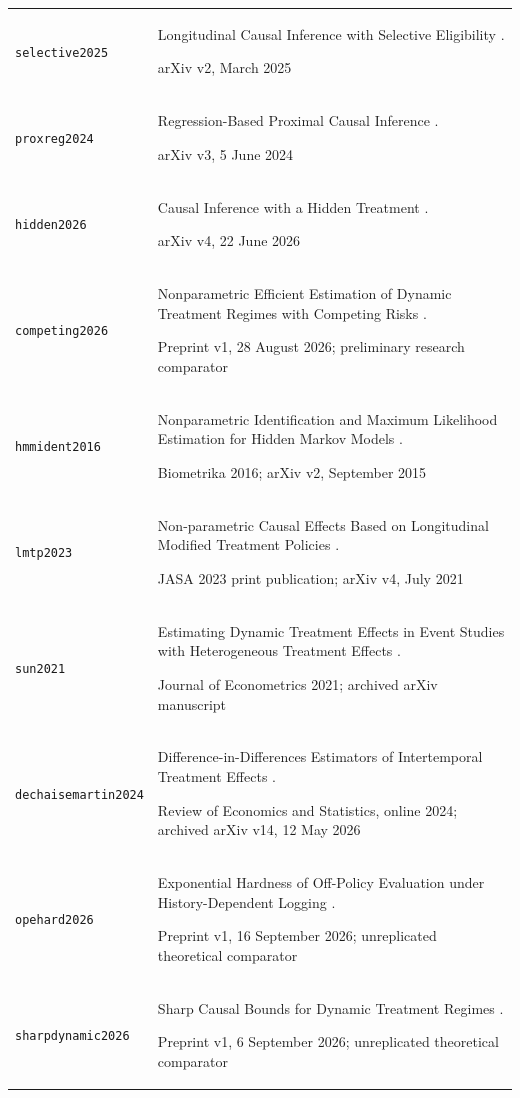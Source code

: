 \begin{longtable}{P{32mm}P{112mm}}
{\scriptsize\texttt{selective2025}} & Longitudinal Causal Inference with Selective Eligibility \citep{selective2025}.\par arXiv v2, March 2025\\
{\scriptsize\texttt{proxreg2024}} & Regression-Based Proximal Causal Inference \citep{proxreg2024}.\par arXiv v3, 5 June 2024\\
{\scriptsize\texttt{hidden2026}} & Causal Inference with a Hidden Treatment \citep{hidden2026}.\par arXiv v4, 22 June 2026\\
{\scriptsize\texttt{competing2026}} & Nonparametric Efficient Estimation of Dynamic Treatment Regimes with Competing Risks \citep{competing2026}.\par Preprint v1, 28 August 2026; preliminary research comparator\\
{\scriptsize\texttt{hmmident2016}} & Nonparametric Identification and Maximum Likelihood Estimation for Hidden Markov Models \citep{hmmident2016}.\par Biometrika 2016; arXiv v2, September 2015\\
{\scriptsize\texttt{lmtp2023}} & Non-parametric Causal Effects Based on Longitudinal Modified Treatment Policies \citep{lmtp2023}.\par JASA 2023 print publication; arXiv v4, July 2021\\
{\scriptsize\texttt{sun2021}} & Estimating Dynamic Treatment Effects in Event Studies with Heterogeneous Treatment Effects \citep{sun2021}.\par Journal of Econometrics 2021; archived arXiv manuscript\\
{\scriptsize\texttt{dechaisemartin2024}} & Difference-in-Differences Estimators of Intertemporal Treatment Effects \citep{dechaisemartin2024}.\par Review of Economics and Statistics, online 2024; archived arXiv v14, 12 May 2026\\
{\scriptsize\texttt{opehard2026}} & Exponential Hardness of Off-Policy Evaluation under History-Dependent Logging \citep{opehard2026}.\par Preprint v1, 16 September 2026; unreplicated theoretical comparator\\
{\scriptsize\texttt{sharpdynamic2026}} & Sharp Causal Bounds for Dynamic Treatment Regimes \citep{sharpdynamic2026}.\par Preprint v1, 6 September 2026; unreplicated theoretical comparator\\

\end{longtable}
